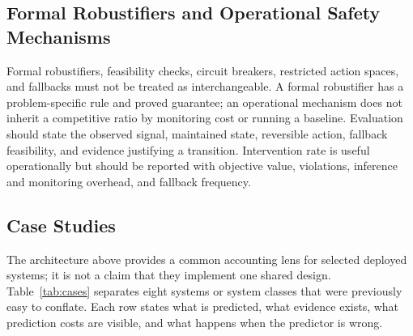 \documentclass[acmsmall,screen,nonacm]{acmart}
\theoremstyle{acmdefinition}%
\begin{document}
\subsection{Formal Robustifiers and Operational Safety Mechanisms}
\label{subsec:safety}

Formal robustifiers, feasibility checks, circuit breakers, restricted action spaces, and fallbacks must not be treated as interchangeable. A formal robustifier has a problem-specific rule and proved guarantee; an operational mechanism does not inherit a competitive ratio by monitoring cost or running a baseline. Evaluation should state the observed signal, maintained state, reversible action, fallback feasibility, and evidence justifying a transition. Intervention rate is useful operationally but should be reported with objective value, violations, inference and monitoring overhead, and fallback frequency.

\subsection{Case Studies}
\label{subsec:cases}

The architecture above provides a common accounting lens for selected deployed systems; it is not a claim that they implement one shared design. Table~\ref{tab:cases} separates eight systems or system classes that were previously easy to conflate. Each row states what is predicted, what evidence exists, what prediction costs are visible, and what happens when the predictor is wrong.
\end{document}
